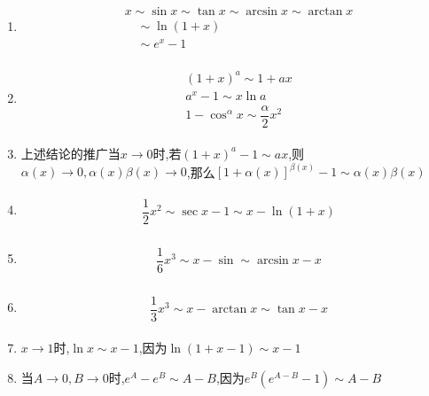 \documentclass[10pt, a4paper, oneside, UTF8]{ctexbook}
\begin{document}
\begin{sloppypar}
\begin{enumerate}
        \item     \begin{align*} \boxed{\begin{aligned}& x \sim \sin x \sim \tan x \sim \arcsin x \sim \arctan x \nonumber \\& \quad  \sim \ln (1+x)  \nonumber                                  \\& \quad \sim e^x -1 \nonumber\end{aligned} }\end{align*}
        \item     \begin{align*} \boxed{\begin{aligned}& (1+x)^a \sim  1+ax   \\& a^x - 1 \sim x \ln a \\& 1- \cos^{\alpha} x \sim \dfrac{\alpha}{2}x^2\end{aligned}}\end{align*}
        \item     {上述结论的推广}{}当$x \to 0$时,若$(1+x)^a -1 \sim ax$,则$\alpha (x) \to 0,\alpha(x)\beta(x) \to 0$,那么$[1+\alpha(x)]^{\beta(x)} -1 \sim \alpha(x) \beta(x)$
        \item     \begin{align*} \boxed
            {
                \begin{aligned}
                     & \dfrac{1}{2} x^2  \sim \sec x -1 \sim x- \ln(1+x)
                \end{aligned}
            }
        \end{align*}
        \item     \begin{align*} \boxed
            {
                \begin{aligned}
                     & \dfrac{1}{6} x^3 \sim x-\sin \sim \arcsin x -x
                \end{aligned}
            }
        \end{align*}
        \item     \begin{align*} \boxed
            {
                \begin{aligned}
                     & \dfrac{1}{3} x^3 \sim x-\arctan x \sim \tan x-x
                \end{aligned}
            }
        \end{align*}
        \item $x \to 1$时,$\ln x \sim x-1$,因为$\ln(1+x-1)\sim x-1$
        \item 当$A\to 0,B \to 0$时,$e^A-e^B \sim A-B$,因为$e^B(e^{A-B}-1)\sim A-B$

\end{enumerate}
\end{sloppypar}
\end{document}
